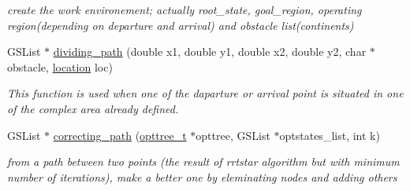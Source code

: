 \begin{DoxyCompactItemize}
\begin{DoxyCompactList}\small\item\em create the work environement; actually root\-\_\-state, goal\-\_\-region, operating region(depending on departure and arrival) and obstacle list(continents) \end{DoxyCompactList}\item 
\-G\-S\-List $\ast$ \hyperlink{a00016_ace68cd1543a0636ed5bbd81dde6e294f_ace68cd1543a0636ed5bbd81dde6e294f}{dividing\-\_\-path} (double x1, double y1, double x2, double y2, char $\ast$obstacle, \hyperlink{a00016_a5f269c22e6d9d32b0b0ad7e6166854df_a5f269c22e6d9d32b0b0ad7e6166854df}{location} loc)
\begin{DoxyCompactList}\small\item\em \-This function is used when one of the daparture or arrival point is situated in one of the complex area already defined. \end{DoxyCompactList}\item 
\-G\-S\-List $\ast$ \hyperlink{a00016_a2a7bcf30e2fa1f22726a7c5187fd7aea_a2a7bcf30e2fa1f22726a7c5187fd7aea}{correcting\-\_\-path} (\hyperlink{a00020_a07b75293fafb6f31b7e9f723848ad105_a07b75293fafb6f31b7e9f723848ad105}{opttree\-\_\-t} $\ast$opttree, \-G\-S\-List $\ast$optstates\-\_\-list, int k)
\begin{DoxyCompactList}\small\item\em from a path between two points (the result of rrtstar algorithm but with minimum number of iterations), make a better one by eleminating nodes and adding others \end{DoxyCompactList}\end{DoxyCompactItemize}


